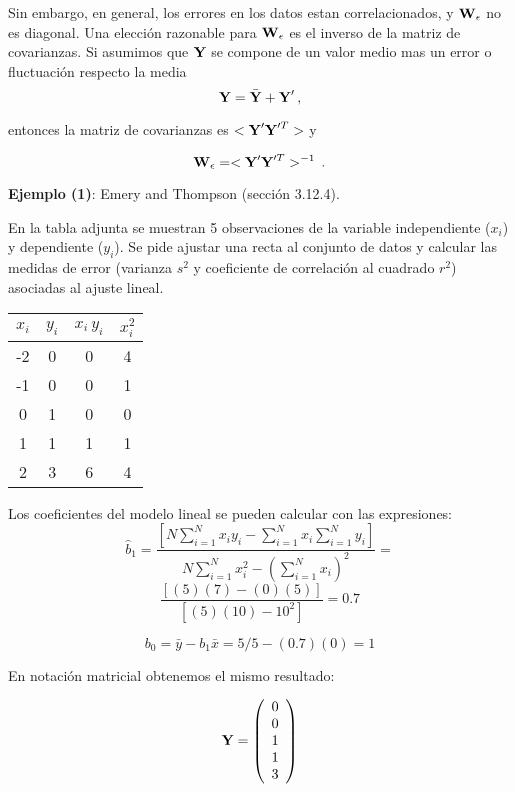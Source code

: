 \documentclass[
]{agujournal2019}
\begin{document}
Sin embargo, en general, los errores en los datos estan correlacionados,
y \({\textbf W}_{\epsilon}\) no es diagonal. Una elección razonable para
\({\textbf W}_{\epsilon}\) es el inverso de la matriz de covarianzas. Si
asumimos que \({\textbf Y}\) se compone de un valor medio mas un error o
fluctuación respecto la media
\[{\textbf Y}=\bar{\textbf Y}+{\textbf Y}'\,,\]

entonces la matriz de covarianzas es \(<{\textbf Y}'{\textbf Y}'^T>\) y

\[{\textbf W}_{\epsilon}=<{\textbf Y}'{\textbf Y}'^T>^{-1}\,.\]

\vspace{0.5cm}

\textbf{Ejemplo (1)}: Emery and Thompson (sección 3.12.4). ~

En la tabla adjunta se muestran 5 observaciones de la variable
independiente (\(x_i\)) y dependiente (\(y_i\)). Se pide ajustar una
recta al conjunto de datos y calcular las medidas de error (varianza
\(s^2\) y coeficiente de correlación al cuadrado \(r^2\)) asociadas al
ajuste lineal.

\begin{center}
\begin{tabular}{c c c c}
\hline\hline
$x_i$ & $y_i$ & $x_i\,y_i$ & $x_i^2$ \\ [0.5ex] %
\hline
-2 & 0 & 0 & 4 \\
-1 & 0 & 0 & 1 \\
0 & 1 & 0 & 0 \\
1 & 1 & 1  & 1 \\
2 & 3 & 6 & 4 \\ [1ex] %
\hline
\end{tabular}
\end{center}

Los coeficientes del modelo lineal se pueden calcular con las
expresiones:
\[\hat{b}_1=\frac{\left[N \sum\limits^N_{i=1} x_i y_i - \sum\limits^N_{i=1}x_i \sum\limits^N_{i=1}y_i\right]}
           {N\sum\limits^N_{i=1}x^2_i-\left(\sum\limits^N_{i=1}x_i \right)^2}=\]
\[\frac{[(5)(7)-(0)(5)]}{[(5)(10)-10^2]}=0.7\]

\[b_0=\bar{y}-b_1\bar{x}=5/5-(0.7)(0)=1\]

En notación matricial obtenemos el mismo resultado:

\[{\textbf Y}=\left(\begin{array}{c}
  0 \\ 0 \\ 1 \\ 1 \\ 3\\
        \end{array}\right)\]
\end{document}
